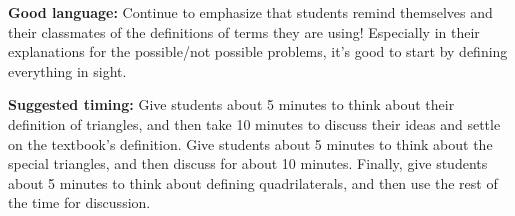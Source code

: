 \documentclass[nooutcomes,noauthor]{ximera}
\begin{document}
\begin{instructorNotes}
{\bf Good language:} Continue to emphasize that students remind themselves and their classmates of the definitions of terms they are using! Especially in their explanations for the possible/not possible problems, it's good to start by defining everything in sight.



{\bf Suggested timing:} Give students about 5 minutes to think about their definition of triangles, and then take 10 minutes to discuss their ideas and settle on the textbook's definition. Give students about 5 minutes to think about the special triangles, and then discuss for about 10 minutes. Finally, give students about 5 minutes to think about defining quadrilaterals, and then use the rest of the time for discussion.


\end{instructorNotes}
\end{document}
